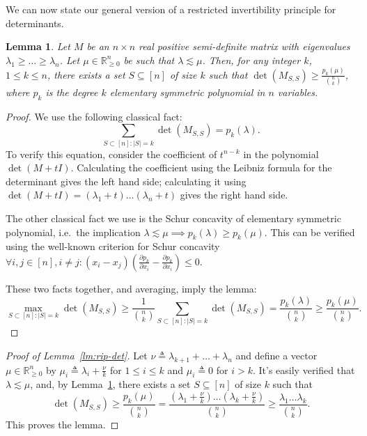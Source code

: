 \documentclass{article}
\newtheorem{lemma}{Lemma}
\newcommand{\R}{{\mathbb{R}}}
\newcommand{\eqdef}{\triangleq}
\begin{document}
We can now state our general version of a restricted invertibility
principle for determinants.
\begin{lemma}\label{lm:rip-general}
  Let $M$ be an $n\times n$ real positive semi-definite matrix with
  eigenvalues $\lambda_1 \ge \ldots \ge \lambda_n$. Let $\mu \in
  \R^n_{\ge 0}$ be such that $\lambda \lesssim \mu$. Then, for any
  integer $k$, $1 \le k \le n$, there exists a set $S \subseteq [n]$
  of size $k$ such that 
  $\det(M_{S,S}) \ge \frac{p_k(\mu)}{{n\choose k}}$, where
  $p_k$ is the degree $k$ elementary symmetric polynomial in $n$
  variables. 
\end{lemma}
\begin{proof}
  We use the following classical fact:
  \begin{equation*}
    \sum_{S \subset [n]: |S| = k}\det(M_{S,S}) = p_k(\lambda).
  \end{equation*}
  To verify this equation, consider the coefficient of $t^{n-k}$ in
  the polynomial $\det(M + tI)$. Calculating the coefficient using the
  Leibniz formula for the determinant gives the left hand side;
  calculating it using $\det(M + tI) = (\lambda_1 +
  t)\ldots(\lambda_n + t)$ gives the right hand side.

  The other classical fact we use is the Schur concavity of elementary
  symmetric polynomial, i.e.~the implication $\lambda \lesssim \mu
  \implies p_k(\lambda) \ge p_k(\mu)$. This can be verified using the
  well-known criterion for Schur concavity $\forall i, j \in [n],
  i\neq j: (x_i - x_j)\left(\frac{\partial p_k}{\partial x_i} -
    \frac{\partial p_k}{\partial x_i} \right) \le 0$.

  These two facts together, and averaging, imply the lemma:
  \[
  \max_{S \subset [n]: |S| = k}\det(M_{S,S}) \ge
  \frac{1}{{n\choose k}} \sum_{S \subset [n]: |S| = k}\det(M_{S,S}) 
  =  \frac{p_k(\lambda)}{{n\choose k}} 
  \ge  \frac{p_k(\mu)}{{n\choose k}} .
  \]
\end{proof}

\begin{proof}[Proof of Lemma~\ref{lm:rip-det}]
  Let $\nu \eqdef \lambda_{k+1} +\ldots + \lambda_n$ and define a
  vector $\mu \in \R_{\ge 0}^n$ by $\mu_i \eqdef \lambda_i + \frac{\nu}{k}$ for
  $1 \le i \le k$ and $\mu_i \eqdef 0$ for $i > k$. It's easily
  verified that
  $\lambda \lesssim \mu$, and, by Lemma~\ref{lm:rip-general}, there
  exists a set $S \subseteq[n]$ of size $k$ such that
  \[
  \det(M_{S,S}) \ge \frac{p_k(\mu)}{{n\choose k}} = \frac{(\lambda_1 +
    \frac{\nu}{k}) \ldots (\lambda_k + \frac{\nu}{k})}{{n\choose k}} 
  \ge \frac{\lambda_1 \ldots \lambda_k}{{n \choose k}}.
  \]
  This proves the lemma.
\end{proof}
\end{document}
